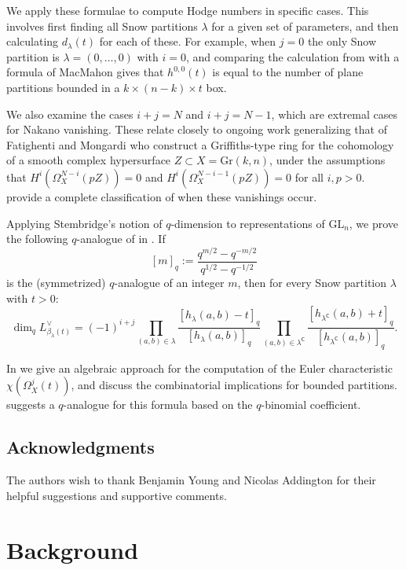 \documentclass{amsart}
\newcommand\C{\mathsf{C}}
\newcommand\GL{\mathrm{GL}}
\theoremstyle{plain}
\theoremstyle{definition}
\numberwithin{equation}{section}
\begin{document}
We apply these formulae to compute Hodge numbers in specific cases. This involves first finding all Snow partitions $\lambda$ for a given set of parameters, and then calculating $d_\lambda(t)$ for each of these. For example, when $j=0$ the only Snow partition is $\lambda=(0,\dots,0)$ with $i=0$, and comparing the calculation from  with a formula of MacMahon \cite{Mac86} gives that $h^{0,0}(t)$ is equal to the number of plane partitions bounded in a $k\times(n-k)\times t$ box.

We also examine the cases $i+j=N$ and $i+j=N-1$, which are extremal cases for Nakano vanishing. These relate closely to ongoing work generalizing that of Fatighenti and Mongardi \cite{Fat21} who construct a Griffiths-type ring for the cohomology of a smooth complex hypersurface $Z\subset X=\mathrm{Gr}(k,n)$, under the assumptions that $H^i(\Omega_X^{N-i}(pZ))=0$ and $H^i(\Omega_X^{N-i-1}(pZ))=0$ for all $i,p>0$.  provide a complete classification of when these vanishings occur. 

Applying Stembridge's notion of $q$-dimension \cite{Stem94} to representations of $\GL_n$, we prove the following $q$-analogue of  in . If
\[[m]_q:=\frac{q^{m/2}-q^{-m/2}}{q^{1/2}-q^{-1/2}}\]
is the (symmetrized) $q$-analogue of an integer $m$, then for every Snow partition $\lambda$ with $t>0$:
\[\dim_q L_{\beta_\lambda(t)}^\vee=(-1)^{i+j}\prod_{(a,b)\in\lambda}\frac{[h_{\lambda}(a,b)-t]_q}{[h_\lambda(a,b)]_q}\prod_{(a,b)\in\lambda^\C}\frac{[h_{\lambda^\C}(a,b)+t]_q}{[h_{\lambda^\C}(a,b)]_q}.\]

In  we give an algebraic approach for the computation of the Euler characteristic $\chi(\Omega_X^j(t))$, and discuss the combinatorial implications for bounded partitions.  suggests a $q$-analogue for this formula based on the $q$-binomial coefficient.

\subsection*{Acknowledgments} The authors wish to thank Benjamin Young and Nicolas Addington for their helpful suggestions and supportive comments.

\section{Background}
\end{document}
